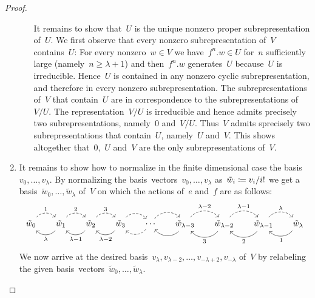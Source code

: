 \begin{proof}
\begin{enumerate}
\begin{enumerate}
          It remains to show that~$U$ is the unique nonzero proper subrepresentation of~$U$.
          We first observe that every nonzero subrepresentation of~$V$ contains~$U$:
          For every nonzero~$w \in V$ we have~$f^n.w \in U$ for~$n$ sufficiently large (namely~$n \geq \lambda+1$) and then~$f^n.w$ generates~$U$ because~$U$ is irreducible.
          Hence~$U$ is contained in any nonzero cyclic subrepresentation, and therefore in every nonzero subrepresentation.
          The subrepresentations of~$V$ that contain~$U$ are in {\onetoone} correspondence to the subrepresentations of~$V/U$.
          The representation~$V/U$ is irreducible and hence admits precisely two subrepresentations, namely~$0$ and~$V/U$.
          Thus~$V$ admits sprecisely two subrepresentations that contain~$U$, namely~$U$ and~$V$.
          This shows altogether that~$0$,~$U$ and~$V$ are the only subrepresentations of~$V$.
      \end{enumerate}
    \item
      It remains to show how to normalize in the finite dimensional case the basis~$v_0, \dotsc, v_\lambda$.
      By normalizing the basis~vectors~$v_0, \dotsc, v_\lambda$ as~$\tilde{w}_i \coloneqq v_i/i!$ we get a basis~$\tilde{w}_0, \dotsc, \tilde{w}_\lambda$ of~$V$ on which the actions of~$e$ and~$f$ are as follows:
      \[
        \begin{tikzcd}[column sep = 1.5em]
          \tilde{w}_0
          \arrow[dashed, bend left = 50]{r}[above]{1}
          &
          \tilde{w}_1
          \arrow[dashed, bend left = 50]{r}[above]{2}
          \arrow[bend left = 50]{l}[below]{\lambda}
          &
          \tilde{w}_2
          \arrow[dashed, bend left = 50]{r}[above]{3}
          \arrow[bend left = 50]{l}[below]{\lambda-1}
          &
          \tilde{w}_3
          \arrow[dashed, bend left = 50]{r}
          \arrow[bend left = 50]{l}[below]{\lambda-2}
          &
          \dotsb
          \arrow[dashed, bend left = 50]{r}
          \arrow[dashed, bend left = 50]{l}
          &
          \tilde{w}_{\lambda-3}
          \arrow[dashed, bend left = 50]{r}[above]{\lambda-2}
          \arrow[bend left = 50]{l}
          &
          \tilde{w}_{\lambda-2}
          \arrow[dashed, bend left = 50]{r}[above]{\lambda-1}
          \arrow[bend left = 50]{l}[below]{3}
          &
          \tilde{w}_{\lambda-1}
          \arrow[dashed, bend left = 50]{r}[above]{\lambda}
          \arrow[bend left = 50]{l}[below]{2}
          &
          \tilde{w}_\lambda
          \arrow[bend left = 50]{l}[below]{1}
        \end{tikzcd}
      \]
      We now arrive at the desired basis~$v_{\lambda}, v_{\lambda-2}, \dotsc, v_{-\lambda+2}, v_{-\lambda}$ of~$V$ by relabeling the given basis~vectors~$\tilde{w}_0, \dotsc, \tilde{w}_\lambda$.
    \qedhere
  \end{enumerate}
\end{proof}


